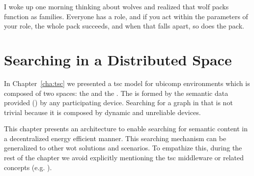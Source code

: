 
\begin{savequote}[50mm]
I woke up one morning thinking about wolves and realized that wolf packs function as families.
Everyone has a role, and if you act within the parameters of your role, the whole pack succeeds, and when that falls apart, so does the pack.
\end{savequote}


\chapter{Searching in a Distributed Space}
\label{cha:searching}


\newcommand{\Space}{\emph{Space}} %
\newcommand{\Spaces}{\emph{Spaces}} %
\newcommand{\consumer}{\emph{Consumer}}
\newcommand{\consumers}{\emph{Consumers}}
\newcommand{\provider}{\emph{Provider}}
\newcommand{\providers}{\emph{Providers}}
\newcommand{\clue}{\emph{clue}}
\newcommand{\clues}{\emph{clues}}


\ifpdf
    \graphicspath{{\pathchapfive/figures/PNG/}{\pathchapfive/figures/PDF/}{\pathchapfive/figures/}}
\else
    \graphicspath{{\pathchapfive/figures/EPS/}{\pathchapfive/figures/}}
\fi



In Chapter~\ref{cha:tsc} we presented a \ac{tsc} model for \ac{ubicomp} environments which is composed of two spaces: the \coordspace{} and the \outerspace{}.
The \outerspace{} is formed by the semantic data provided (\selfgraphs{}) by any participating device.
Searching for a graph in that \outerspace{} is not trivial because it is composed by dynamic and unreliable devices.

This chapter presents an architecture to enable searching for semantic content in a decentralized energy efficient manner.
This searching mechanism can be generalized to other \ac{wot} solutions and scenarios.
To empathize this, during the rest of the chapter we avoid explicitly mentioning the \ac{tsc} middleware or related concepts (e.g. \outerspace{}).



